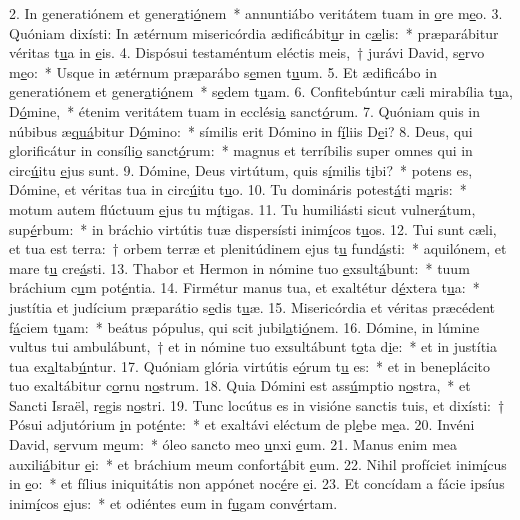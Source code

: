 2. In generatiónem et gener\uline{a}ti\uline{ó}nem~* annuntiábo veritátem tuam in \uline{o}re m\uline{e}o.
3. Quóniam dixísti: In ætérnum misericórdia ædificábit\uline{u}r in c\uline{æ}lis:~* præparábitur véritas t\uline{u}a in \uline{e}is.
4. Dispósui testaméntum eléctis meis,~† jurávi David, s\uline{e}rvo m\uline{e}o:~* Usque in ætérnum præparábo s\uline{e}men t\uline{u}um.
5. Et ædificábo in generatiónem et gener\uline{a}ti\uline{ó}nem~* s\uline{e}dem t\uline{u}am.
6. Confitebúntur cæli mirabília t\uline{u}a, D\uline{ó}mine,~* étenim veritátem tuam in ecclési\uline{a} sanct\uline{ó}rum.
7. Quóniam quis in núbibus æ\uline{quá}bitur D\uline{ó}mino:~* símilis erit Dómino in f\uline{í}liis D\uline{e}i?
8. Deus, qui glorificátur in consíli\uline{o} sanct\uline{ó}rum:~* magnus et terríbilis super omnes qui in circ\uline{ú}itu \uline{e}jus sunt.
9. Dómine, Deus virtútum, quis s\uline{í}milis t\uline{i}bi?~* potens es, Dómine, et véritas tua in circ\uline{ú}itu t\uline{u}o.
10. Tu domináris potest\uline{á}ti m\uline{a}ris:~* motum autem flúctuum \uline{e}jus tu m\uline{í}tigas.
11. Tu humiliásti sicut vulner\uline{á}tum, sup\uline{é}rbum:~* in bráchio virtútis tuæ dispersísti inim\uline{í}cos t\uline{u}os.
12. Tui sunt cæli, et tua est terra:~† orbem terræ et plenitúdinem ejus t\uline{u} fund\uline{á}sti:~* aquilónem, et mare t\uline{u} cre\uline{á}sti.
13. Thabor et Hermon in nómine tuo \uline{e}xsult\uline{á}bunt:~* tuum bráchium c\uline{u}m pot\uline{é}ntia.
14. Firmétur manus tua, et exaltétur d\uline{é}xtera t\uline{u}a:~* justítia et judícium præparátio s\uline{e}dis t\uline{u}æ.
15. Misericórdia et véritas præcédent f\uline{á}ciem t\uline{u}am:~* beátus pópulus, qui scit jubil\uline{a}ti\uline{ó}nem.
16. Dómine, in lúmine vultus tui ambulábunt,~† et in nómine tuo exsultábunt t\uline{o}ta d\uline{i}e:~* et in justítia tua ex\uline{a}ltab\uline{ú}ntur.
17. Quóniam glória virtútis e\uline{ó}rum t\uline{u} es:~* et in beneplácito tuo exaltábitur c\uline{o}rnu n\uline{o}strum.
18. Quia Dómini est ass\uline{ú}mptio n\uline{o}stra,~* et Sancti Israël, r\uline{e}gis n\uline{o}stri.
19. Tunc locútus es in visióne sanctis tuis, et dixísti:~† Pósui adjutórium \uline{i}n pot\uline{é}nte:~* et exaltávi eléctum de pl\uline{e}be m\uline{e}a.
20. Invéni David, s\uline{e}rvum m\uline{e}um:~* óleo sancto meo \uline{u}nxi \uline{e}um.
21. Manus enim mea auxili\uline{á}bitur \uline{e}i:~* et bráchium meum confort\uline{á}bit \uline{e}um.
22. Nihil profíciet inim\uline{í}cus in \uline{e}o:~* et fílius iniquitátis non appónet noc\uline{é}re \uline{e}i.
23. Et concídam a fácie ipsíus inim\uline{í}cos \uline{e}jus:~* et odiéntes eum in f\uline{u}gam conv\uline{é}rtam.
